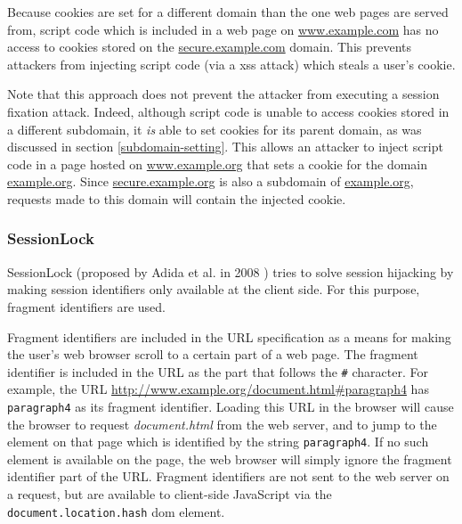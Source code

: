 Because cookies are set for a different domain than the one web pages are served from, script code which is included in a web page on \url{www.example.com} has no access to cookies stored on the \url{secure.example.com} domain. This prevents attackers from injecting script code (via a \gls{xss} attack) which steals a user's cookie.

Note that this approach does not prevent the attacker from executing a session fixation attack. Indeed, although script code is unable to access cookies stored in a different subdomain, it \emph{is} able to set cookies for its parent domain, as was discussed in section \ref{subdomain-setting}. This allows an attacker to inject script code in a page hosted on \url{www.example.org} that sets a cookie for the domain \url{example.org}. Since \url{secure.example.org} is also a subdomain of \url{example.org}, requests made to this domain will contain the injected cookie.

\subsubsection{SessionLock}

SessionLock (proposed by Adida et al. in 2008 \cite{Adida2008}) tries to solve session hijacking by making session identifiers only available at the client side. For this purpose, fragment identifiers are used.

Fragment identifiers are included in the URL specification \cite{rfc3986} as a means for making the user's web browser scroll to a certain part of a web page. The fragment identifier is included in the URL as the part that follows the \texttt{\#} character. For example, the URL \url{http://www.example.org/document.html#paragraph4} has \texttt{paragraph4} as its fragment identifier. Loading this URL in the browser will cause the browser to request \emph{document.html} from the web server, and to jump to the element on that page which is identified by the string \texttt{paragraph4}. If no such element is available on the page, the web browser will simply ignore the fragment identifier part of the URL. Fragment identifiers are not sent to the web server on a request, but are available to client-side JavaScript via the \texttt{document.location.hash} \gls{dom} element.

